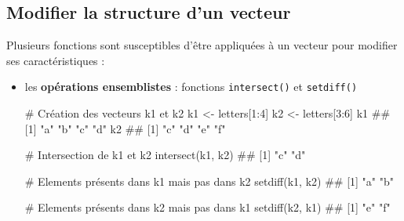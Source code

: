 \documentclass[12pt,twosided, notitlepage]{book}
\newenvironment{Shaded}{}{}
\newcommand{\KeywordTok}[1]{\textcolor[rgb]{0.00,0.00,1.00}{{#1}}}
\newcommand{\DecValTok}[1]{{#1}}
\newcommand{\StringTok}[1]{\textcolor[rgb]{0.00,0.50,0.50}{{#1}}}
\newcommand{\CommentTok}[1]{\textcolor[rgb]{0.00,0.50,0.00}{{#1}}}
\newcommand{\NormalTok}[1]{{#1}}
\renewenvironment{Shaded}{\begin{snugshade}}{\end{snugshade}}
\begin{document}
\subsection{Modifier la structure d'un
vecteur}\label{modifier-la-structure-dun-vecteur}

Plusieurs fonctions sont susceptibles d'être appliquées à un vecteur
pour modifier ses caractéristiques :

\begin{itemize}
\item
  les \textbf{opérations ensemblistes} : fonctions
  \texttt{intersect()} et
  \texttt{setdiff()}

\begin{Shaded}
\begin{Highlighting}[]
\CommentTok{# Création des vecteurs k1 et k2}
\NormalTok{k1 <-}\StringTok{ }\NormalTok{letters[}\DecValTok{1}\NormalTok{:}\DecValTok{4}\NormalTok{]}
\NormalTok{k2 <-}\StringTok{ }\NormalTok{letters[}\DecValTok{3}\NormalTok{:}\DecValTok{6}\NormalTok{]}
\NormalTok{k1}
  \NormalTok{## [1] "a" "b" "c" "d"}
\NormalTok{k2}
  \NormalTok{## [1] "c" "d" "e" "f"}

\CommentTok{# Intersection de k1 et k2}
\KeywordTok{intersect}\NormalTok{(k1, k2)}
  \NormalTok{## [1] "c" "d"}

\CommentTok{# Elements présents dans k1 mais pas dans k2}
\KeywordTok{setdiff}\NormalTok{(k1, k2)}
  \NormalTok{## [1] "a" "b"}

\CommentTok{# Elements présents dans k2 mais pas dans k1}
\KeywordTok{setdiff}\NormalTok{(k2, k1)}
  \NormalTok{## [1] "e" "f"}
\end{Highlighting}
\end{Shaded}
\end{itemize}

~
\end{document}
